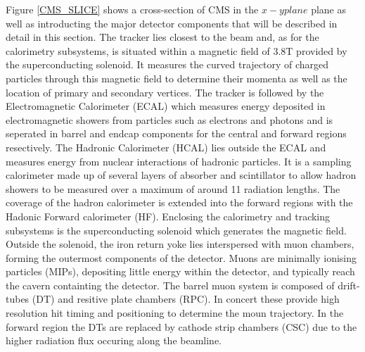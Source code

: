 Figure \ref{CMS_SLICE} shows a cross-section of CMS in the $x-y plane$ plane as well as introducting the major detector components that will be described 
in detail in this section. The tracker lies closest to the beam and, as for the calorimetry subsystems, is situated within a magnetic field of 3.8T provided
by the superconducting solenoid. It measures the curved trajectory of charged particles through this magnetic field to determine their momenta 
as well as the location of primary and secondary vertices. The tracker is followed by the Electromagnetic Calorimeter (ECAL)
which measures energy deposited in electromagnetic showers from particles such as electrons and photons and is seperated in barrel and endcap 
components for the central and forward regions resectively. The Hadronic Calorimeter (HCAL) lies outside the 
ECAL and measures energy from nuclear interactions of hadronic particles. It is a sampling calorimeter
made up of several layers of absorber and scintillator to allow hadron showers to be measured over a maximum of around 11 radiation lengths. 
The coverage of the hadron calorimeter is extended into the forward regions with the Hadonic Forward calorimeter (HF). Enclosing the calorimetry and tracking subsystems 
is the superconducting solenoid which generates the magnetic field. Outside the solenoid, the iron return yoke lies interspersed with muon chambers, forming the outermost components of the detector. 
Muons are minimally ionising particles (MIPs), depositing little energy within the detector, and typically reach the cavern containting the detector. 
The barrel muon system is composed of drift-tubes (DT) and resitive plate chambers (RPC). In concert these provide
high resolution hit timing and positioning to determine the moun trajectory. In the forward region the DTs are replaced by cathode strip chambers 
(CSC) due to the higher radiation flux occuring along the beamline. 

